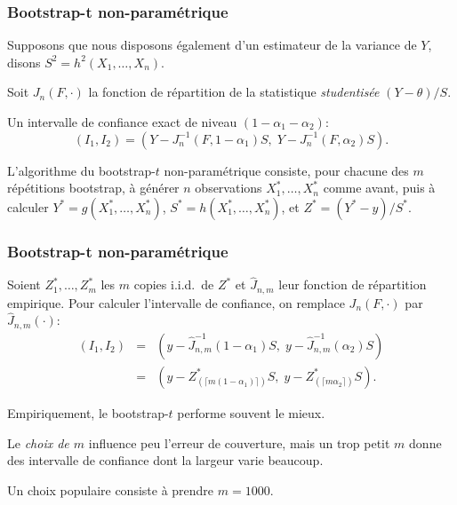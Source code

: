 \documentclass[t,usepdftitle=false]{beamer}
\def\iid{i.i.d.}
\begin{document}
\begin{frame}
\frametitle{Bootstrap-t non-paramétrique}

Supposons que nous disposons également d'un estimateur de la variance de $Y$, disons  ${S^2} = {h}^2(X_1,\dots,X_n)$.

\mbox{}

Soit ${J_n(F,\cdot)}$ la fonction de répartition de la statistique \emph{studentisée} $(Y - \theta)/S$.

\mbox{}

Un intervalle de confiance exact de niveau $(1-\alpha_1-\alpha_2)$:
\[
  (I_1, I_2) =
  (Y - J_n^{-1}(F,1-\alpha_1) S,\;  Y - J_n^{-1}(F,\alpha_2) S).
\]

\mbox{}

L'algorithme du bootstrap-$t$ non-paramétrique consiste, pour chacune des ${m}$ répétitions bootstrap, à générer ${n}$ observations $X_1^*,\ldots,X_n^*$ comme avant, puis à calculer ${Y^*} = g(X_1^*,\dots,X_n^*)$,   ${S^*} = h(X_1^*,\dots,X_n^*)$, et ${Z^*} = (Y^*-y)/S^*$.

\end{frame}

\begin{frame}
\frametitle{Bootstrap-t non-paramétrique}

Soient ${Z_1^*}, \dots, {Z_m^*}$ les $m$ copies \iid\ de $Z^*$ et
${\hat J_{n,m}}$ leur fonction de répartition empirique.
Pour calculer l'intervalle de confiance, on remplace $J_n(F,\cdot)$ par $\hat J_{n,m}(\cdot)$:
\begin{eqnarray*}
  (I_1, I_2)
 &=& (y - \hat J_{n,m}^{-1}(1-\alpha_1) S,\; 
      y - \hat J_{n,m}^{-1}(\alpha_2) S) \\
 &=& (y - Z_{(\lceil m(1-\alpha_1)\rceil)}^* S,\;
      y - Z_{(\lceil m\alpha_2\rceil)}^* S). \nonumber
\end{eqnarray*}

\mbox{}

Empiriquement, le bootstrap-$t$ performe souvent le mieux.

\mbox{}

Le \emph{choix de $m$} influence peu l'erreur de couverture, mais un trop
petit $m$ donne des intervalle de confiance dont la largeur varie beaucoup.

\mbox{}

Un choix populaire consiste à prendre $m = 1000$.

\end{frame}
\end{document}
